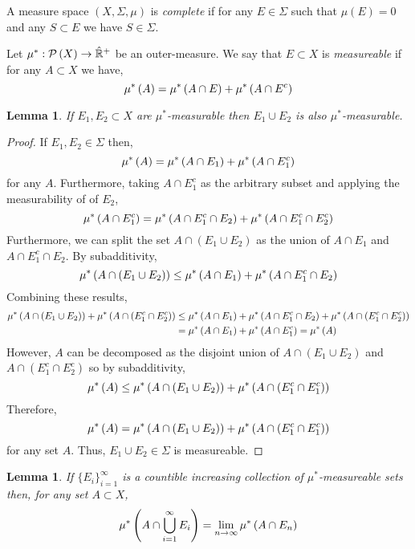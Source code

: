 \documentclass{article}
\newenvironment{definition}[1][Definition:]{\begin{trivlist}
\item[\hskip \labelsep {\bfseries #1}]}{\end{trivlist}}
\theoremstyle{theorem}
\newtheorem{lemma}[theorem]{Lemma}
\theoremstyle{definition}
\theoremstyle{definition}
\theoremstyle{remark}
\theoremstyle{definition}
\theoremstyle{remark}
\begin{document}
\begin{definition}
A measure space $(X, \Sigma, \mu)$ is \textit{complete} if for any $E \in \Sigma$ such that $\mu(E) = 0$ and any $S \subset E$ we have $S \in \Sigma$.  
\end{definition}

\begin{definition}
Let $\mu^* : \mathcal{P}\left( X \right) \to \hat{\mathbb{R}}^+$ be an outer-measure. We say that $E \subset X$ is \textit{measureable} if for any $A \subset X$ we have,
\[ \mu^*\left( A \right) = \mu^*\left( A \cap E \right) + \mu^*\left( A \cap E^c \right) \]
\end{definition}

\begin{lemma}
If $E_1, E_2 \subset X$ are $\mu^*$-measurable then $E_1 \cup E_2$ is also $\mu^*$-measurable.
\end{lemma}

\begin{proof}
If $E_1, E_2 \in \Sigma$ then,
\[ \mu^*\left( A \right) = \mu^*\left( A \cap E_1 \right) + \mu^*\left( A \cap E_1^c \right)  \]
for any $A$. Furthermore, taking $A \cap E_1^c$ as the arbitrary subset and applying the measurability of of $E_2$,
\[ \mu^*\left( A \cap E_1^c \right) = \mu^*\left( A \cap E_1^c \cap E_2 \right) + \mu^*\left( A \cap E_1^c \cap E_2^c \right) \]
Furthermore, we can split the set $A \cap (E_1 \cup E_2)$ as the union of $A \cap E_1$ and $A \cap E_1^c \cap E_2$. By subadditivity,
\[ \mu^*\left( A \cap (E_1 \cup E_2) \right) \le \mu^*\left( A \cap E_1 \right) + \mu^*\left( A \cap E_1^c \cap E_2 \right) \]
Combining these results,
\begin{align*}
\mu^*\left( A \cap (E_1 \cup E_2) \right) + \mu^*\left( A \cap (E_1^c \cap E_2^c) \right) & \le \mu^*\left( A \cap E_1 \right) + \mu^*\left( A \cap E_1^c \cap E_2 \right) + \mu^*\left( A \cap (E_1^c \cap E_2^c) \right) 
\\
& = \mu^*\left( A \cap E_1 \right) + \mu^*\left( A \cap E_1^c \right) = \mu^*\left( A \right)
\end{align*}
However, $A$ can be decomposed as the disjoint union of $A \cap (E_1 \cup E_2)$ and $A \cap (E_1^c \cap E_2^c)$ so by subadditivity,
\[ \mu^*\left( A \right) \le \mu^*\left( A \cap (E_1 \cup E_2) \right) + \mu^*\left( A \cap (E_1^c \cap E_1^c) \right) \]
Therefore,
\[ \mu^*\left( A \right) = \mu^*\left( A \cap (E_1 \cup E_2) \right) + \mu^*\left( A \cap (E_1^c \cap E_1^c) \right) \]
for any set $A$. Thus, $E_1 \cup E_2 \in \Sigma$ is measureable. 
\end{proof}

\begin{lemma} \label{sigma_alg_limits}
If $\{ E_i \}_{i = 1}^{\infty}$ is a countible increasing collection of $\mu^*$-measureable sets then, for any set $A \subset X$,
\[ \mu^*\left( A \cap \bigcup_{i = 1}^\infty E_i \right) = \lim_{n \to \infty} \mu^*\left( A \cap E_n \right) \]
\end{lemma}
\end{document}
